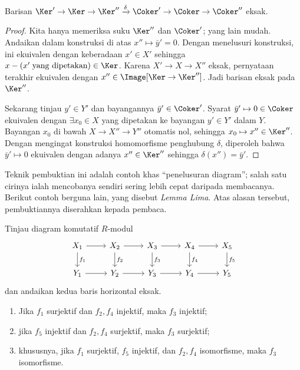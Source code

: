 \begin{proposition}\label{prop:snake-lemma-mod}
	Barisan $\Ker' \to \Ker \to \Ker'' \xrightarrow{\delta} \Coker' \to \Coker \to \Coker''$ eksak.
\end{proposition}
\begin{proof}
	Kita hanya memeriksa suku $\Ker''$ dan $\Coker'$; yang lain mudah. Andaikan dalam konstruksi di atas $x'' \mapsto \bar{y}' = 0$. Dengan menelusuri konstruksi, ini ekuivalen dengan keberadaan $x' \in X'$ sehingga $x - (x'\;\text{yang dipetakan}) \in \Ker$. Karena $X' \to X \to X''$ eksak, pernyataan terakhir ekuivalen dengan $x'' \in \Image[\Ker \to \Ker'']$. Jadi barisan eksak pada $\Ker''$.

	Sekarang tinjau $y' \in Y'$ dan bayangannya $\bar{y}' \in \Coker'$. Syarat $\bar{y}' \mapsto 0 \in \Coker$ ekuivalen dengan $\exists x_0 \in X$ yang dipetakan ke bayangan $y' \in Y'$ dalam $Y$. Bayangan $x_0$ di bawah $X \to X'' \to Y''$ otomatis nol, sehingga $x_0 \mapsto x'' \in \Ker''$. Dengan mengingat konstruksi homomorfisme penghubung $\delta$, diperoleh bahwa $\bar{y}' \mapsto 0$ ekuivalen dengan adanya $x'' \in \Ker''$ sehingga $\delta(x'') = \bar{y}'$.
\end{proof}
Teknik pembuktian ini adalah contoh khas ``penelusuran diagram''; salah satu cirinya ialah mencobanya sendiri sering lebih cepat daripada membacanya. Berikut contoh berguna lain, yang disebut \emph{Lemma Lima}. Atas alasan tersebut, pembuktiannya diserahkan kepada pembaca.

\begin{proposition}\label{prop:5-lemma-mod}
	Tinjau diagram komutatif $R$-modul
	\[\begin{tikzcd}
		X_1 \arrow[r] \arrow[d, "f_1"] & X_2 \arrow[r] \arrow[d, "f_2"] & X_3 \arrow[r] \arrow[d, "f_3"] & X_4 \arrow[r] \arrow[d, "f_4"] & X_5 \arrow[d, "f_5"] \\
		Y_1 \arrow[r] & Y_2 \arrow[r] & Y_3 \arrow[r] & Y_4 \arrow[r] & Y_5
	\end{tikzcd}\]
	dan andaikan kedua baris horizontal eksak.
	\begin{enumerate}
		\item Jika $f_1$ surjektif dan $f_2, f_4$ injektif, maka $f_3$ injektif;
		\item jika $f_5$ injektif dan $f_2, f_4$ surjektif, maka $f_3$ surjektif;
		\item khususnya, jika $f_1$ surjektif, $f_5$ injektif, dan $f_2, f_4$ isomorfisme, maka $f_3$ isomorfisme.
	\end{enumerate}
\end{proposition}

